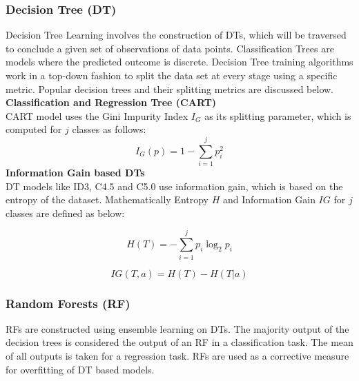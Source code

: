 \documentclass[a4paper, 12pt]{article}
\begin{document}
\subsubsection{Decision Tree (DT)}
\noindent Decision Tree Learning involves the construction of DTs, which will be traversed to conclude a given set of observations of data points. Classification Trees are models where the predicted outcome is discrete. Decision Tree training algorithms work in a top-down fashion to split the data set at every stage using a specific metric. Popular decision trees and their splitting metrics are discussed below.
\vskip 0.2in
\noindent\textbf{Classification and Regression Tree (CART)} \\
\noindent CART model uses the Gini Impurity Index \(I_G\) as its splitting parameter, which is computed for \(j\) classes as follows:
\begin{equation}
    I_{G}(p) = 1 - \sum_{i = 1}^{j} p_i^2
\end{equation}
\vskip 0.2in
\noindent\textbf{Information Gain based DTs} \\
\noindent DT models like ID3, C4.5 and C5.0 use information gain, which is based on the entropy  of the dataset. Mathematically Entropy \(H\) and Information Gain \(IG\) for \(j\) classes are defined as below:

\begin{equation}
    H(T) = - \sum_{i=1}^{j} p_i \log_2 p_i
\end{equation}

\begin{equation}
    IG(T, a) =  H(T) - H(T|a)
\end{equation}

\vskip 0.2in
\subsubsection{Random Forests (RF)}
\noindent RFs are constructed using ensemble learning on DTs. The majority output of the decision trees is considered the output of an RF in a classification task. The mean of all outputs is taken for a regression task. RFs are used as a corrective measure for overfitting of DT based models.

\vskip 0.2in
\end{document}
